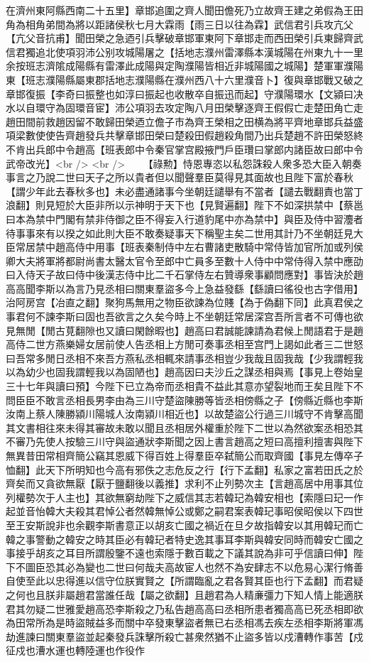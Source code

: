 在濟州東阿縣西南二十五里】章邯追圍之齊人聞田儋死乃立故齊王建之弟假為王田角為相角弟間為將以距諸侯秋七月大霖雨【雨三日以往為霖】武信君引兵攻亢父【亢父音抗甫】聞田榮之急迺引兵擊破章邯軍東阿下章邯走而西田榮引兵東歸齊武信君獨追北使項羽沛公别攻城陽屠之【括地志濮州雷澤縣本漢城陽在州東九十一里余按班志濟隂成陽縣有雷澤此成陽與定陶濮陽皆相近非城陽國之城陽】楚軍軍濮陽東【班志濮陽縣屬東郡括地志濮陽縣在濮州西八十六里濮音卜】復與章邯戰又破之章邯復振【李奇曰振整也如淳曰振起也收散卒自振迅而起】守濮陽環水【文潁曰决水以自環守為固環音宦】沛公項羽去攻定陶八月田榮擊逐齊王假假亡走楚田角亡走趙田間前救趙因留不敢歸田榮迺立儋子市為齊王榮相之田横為將平齊地章邯兵益盛項梁數使使告齊趙發兵共擊章邯田榮曰楚殺田假趙殺角間乃出兵楚趙不許田榮怒終不肯出兵郎中令趙高【班表郎中令秦官掌宫殿掖門戶臣瓚曰掌郎内諸臣故曰郎中令武帝改光】<br />
<br />
　　【祿勲】恃恩專恣以私怨誅殺人衆多恐大臣入朝奏事言之乃說二世曰天子之所以貴者但以聞聲羣臣莫得見其面故也且陛下富於春秋【謂少年此去春秋多也】未必盡通諸事今坐朝廷譴舉有不當者【譴去戰翻責也當丁浪翻】則見短於大臣非所以示神明于天下也【見賢遍翻】陛下不如深拱禁中【蔡邕曰本為禁中門閣有禁非侍御之臣不得妄入行道豹尾中亦為禁中】與臣及侍中習灋者待事事來有以揆之如此則大臣不敢奏疑事天下稱聖主矣二世用其計乃不坐朝廷見大臣常居禁中趙高侍中用事【班表秦制侍中左右曹諸吏散騎中常侍皆加官所加或列侯卿大夫將軍將都尉尚書太醫太官令至郎中亡員多至數十人侍中中常侍得入禁中應劭曰入侍天子故曰侍中後漢志侍中比二千石掌侍左右贊導衆事顧問應對】事皆決於趙高高聞李斯以為言乃見丞相曰關東羣盜多今上急益發繇【繇讀曰徭役也古字借用】治阿房宫【冶直之翻】聚狗馬無用之物臣欲諫為位賤【為于偽翻下同】此真君侯之事君何不諫李斯曰固也吾欲言之久矣今時上不坐朝廷常居深宫吾所言者不可傳也欲見無閒【閒古莧翻隙也又讀曰閑餘暇也】趙高曰君誠能諫請為君候上閒語君于是趙高侍二世方燕樂婦女居前使人告丞相上方閒可奏事丞相至宫門上謁如此者三二世怒曰吾常多閒日丞相不來吾方燕私丞相輒來請事丞相豈少我哉且固我哉【少我謂輕我以為幼少也固我謂輕我以為固陋也】趙高因曰夫沙丘之謀丞相與焉【事見上卷始皇三十七年與讀曰預】今陛下已立為帝而丞相貴不益此其意亦望裂地而王矣且陛下不問臣臣不敢言丞相長男李由為三川守楚盜陳勝等皆丞相傍縣之子【傍縣近縣也李斯汝南上蔡人陳勝潁川陽城人汝南潁川相近也】以故楚盜公行過三川城守不肯擊高聞其文書相往來未得其審故未敢以聞且丞相居外權重於陛下二世以為然欲案丞相恐其不審乃先使人按驗三川守與盜通狀李斯聞之因上書言趙高之短曰高擅利擅害與陛下無異昔田常相齊簡公竊其恩威下得百姓上得羣臣卒弑簡公而取齊國【事見左傳卒子恤翻】此天下所明知也今高有邪佚之志危反之行【行下孟翻】私家之富若田氏之於齊矣而又貪欲無厭【厭于鹽翻後以義推】求利不止列勢次主【言趙高居中用事其位列權勢次于人主也】其欲無窮劫陛下之威信其志若韓玘為韓安相也【索隱曰玘一作起並音怡韓大夫殺其君悼公者然韓無悼公或鄭之嗣君案表韓玘事昭侯昭侯以下四世至王安斯說非也余觀李斯書意正以胡亥亡國之禍近在旦夕故指韓安以其用韓玘而亡韓之事警動之韓安之時其臣必有韓玘者特史逸其事耳李斯與韓安同時而韓安亡國之事接乎胡亥之耳目所謂殷鑒不遠也索隱于數百載之下議其說為非可乎信讀曰伸】陛下不圖臣恐其必為變也二世曰何哉夫高故宦人也然不為安肆志不以危易心潔行脩善自使至此以忠得進以信守位朕實賢之【所謂臨亂之君各賢其臣也行下孟翻】而君疑之何也且朕非屬趙君當誰任哉【屬之欲翻】且趙君為人精亷彊力下知人情上能適朕君其勿疑二世雅愛趙高恐李斯殺之乃私告趙高高曰丞相所患者獨高高已死丞相即欲為田常所為是時盜賊益多而關中卒發東擊盜者無已右丞相馮去疾左丞相李斯將軍馮劫進諫曰關東羣盜並起秦發兵誅擊所殺亡甚衆然猶不止盜多皆以戍漕轉作事苦【戍征戍也漕水運也轉陸運也作役作